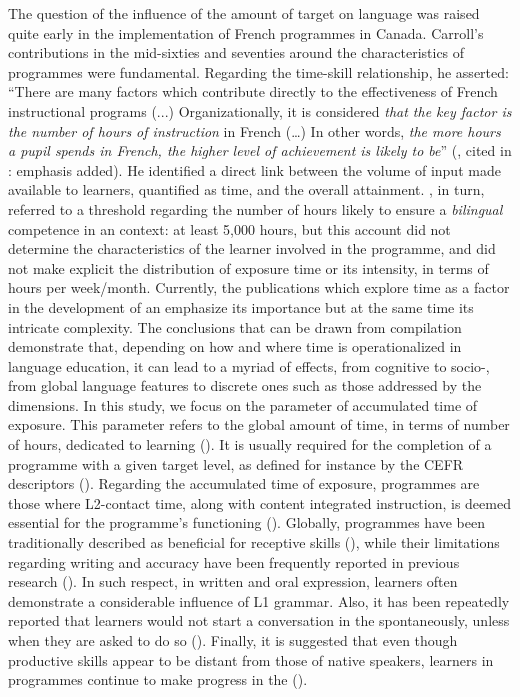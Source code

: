 \documentclass[output=paper]{langsci/langscibook}
\begin{document}
The question of the influence of the amount of target  on language  was raised quite early in the implementation of French  programmes in Canada. Carroll’s contributions in the mid-sixties and seventies around the characteristics of  programmes were fundamental. Regarding the time-skill relationship, he asserted: “There are many factors which contribute directly to the effectiveness of French instructional programs (...) Organizationally, it is considered \textit{that the key factor is the number of hours of instruction} in French (…) In other words, \textit{the more hours a pupil spends in French, the higher level of achievement is likely to be}” (\citet[8]{Carroll1975}, cited in \citet[1-2]{Swain1981}: emphasis added). He identified a direct link between the volume of input made available to learners, quantified as time, and the overall  attainment. \citet{Stern1985}, in turn, referred to a threshold regarding the number of hours likely to ensure a \textit{bilingual} competence in an  context: at least 5,000 hours, but this account did not determine the characteristics of the learner involved in the programme, and did not make explicit the distribution of exposure time or its intensity, in terms of hours per week/month. Currently, the publications which explore time as a factor in the development of an  emphasize its importance but at the same time its intricate complexity.  The conclusions that can be drawn from  compilation demonstrate that, depending on how and where time is operationalized in language education, it can lead to a myriad of effects, from cognitive to socio-, from global language features to discrete ones such as those addressed by the  dimensions. In this study, we focus on the parameter of accumulated time of exposure. This parameter refers to the global amount of time, in terms of number of hours, dedicated to  learning (\citealt{Stern1985,Genesee1978,Genesee2013}). It is usually required for the completion of a programme with a given target  level, as defined for instance by the CEFR descriptors (\citealt{CouncilofEurope2001}).  Regarding the accumulated time of exposure,  programmes are those where L2-contact time, along with content integrated instruction, is deemed essential for the programme’s functioning (\citealt{CollinsEtAl1999}). Globally,  programmes have been traditionally described as beneficial for receptive skills (\citealt{DayShapson1988}), while their limitations regarding writing and accuracy have been frequently reported in previous research (\citealt{Lightbown2012,GermainEtAl2004}). In such respect, in written and oral expression,  learners often demonstrate a considerable influence of L1 grammar. Also, it has been repeatedly reported that learners would not start a conversation in the  spontaneously, unless when they are asked to do so (\citealt{Harley1992,Wesche2002}). Finally, it is suggested that even though productive skills appear to be distant from those of native speakers, learners in  programmes continue to make progress in the  (\citealt{Harley1992,Wesche1989,Housen2012}).
\end{document}
